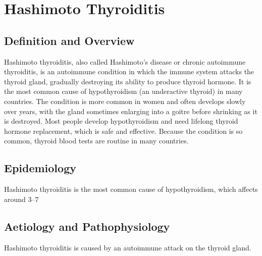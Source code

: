 \chapter{Hashimoto Thyroiditis}

\section*{Definition and Overview}
Hashimoto thyroiditis, also called Hashimoto's disease or chronic autoimmune thyroiditis, is an autoimmune condition in which the immune system attacks the thyroid gland, gradually destroying its ability to produce thyroid hormone. It is the most common cause of hypothyroidism (an underactive thyroid) in many countries. The condition is more common in women and often develops slowly over years, with the gland sometimes enlarging into a goitre before shrinking as it is destroyed. Most people develop hypothyroidism and need lifelong thyroid hormone replacement, which is safe and effective. Because the condition is so common, thyroid blood tests are routine in many countries.

\section*{Epidemiology}
Hashimoto thyroiditis is the most common cause of hypothyroidism, which affects around 3--7%

\section*{Aetiology and Pathophysiology}
Hashimoto thyroiditis is caused by an autoimmune attack on the thyroid gland.


